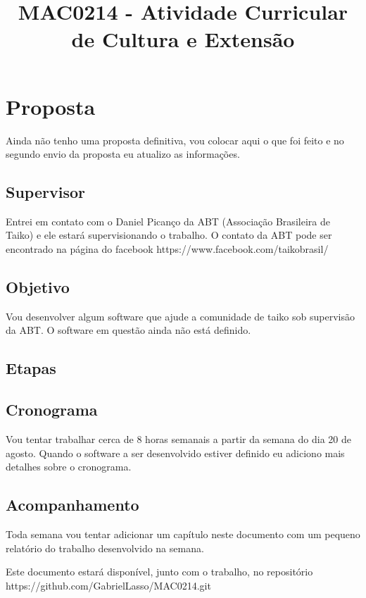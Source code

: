 \documentclass{report}
\title{MAC0214 - Atividade Curricular de Cultura e Extensão}
\begin{document}
\maketitle
\chapter{Proposta}

Ainda não tenho uma proposta definitiva, vou colocar aqui o que foi feito e no segundo envio da proposta eu atualizo as informações.

\section{Supervisor}
Entrei em contato com o Daniel Picanço da ABT (Associação Brasileira de Taiko) e ele estará supervisionando o trabalho. O contato da ABT pode ser encontrado na página do facebook https://www.facebook.com/taikobrasil/

\section{Objetivo}
Vou desenvolver algum software que ajude a comunidade de taiko sob supervisão da ABT. O software em questão ainda não está definido.

\section{Etapas}


\section{Cronograma}
Vou tentar trabalhar cerca de 8 horas semanais a partir da semana do dia 20 de agosto. Quando o software a ser desenvolvido estiver definido eu adiciono mais detalhes sobre o cronograma.

\section{Acompanhamento}
Toda semana vou tentar adicionar um capítulo neste documento com um pequeno relatório do trabalho desenvolvido na semana. 

Este documento estará disponível, junto com o trabalho, no repositório https://github.com/GabrielLasso/MAC0214.git
\end{document}
